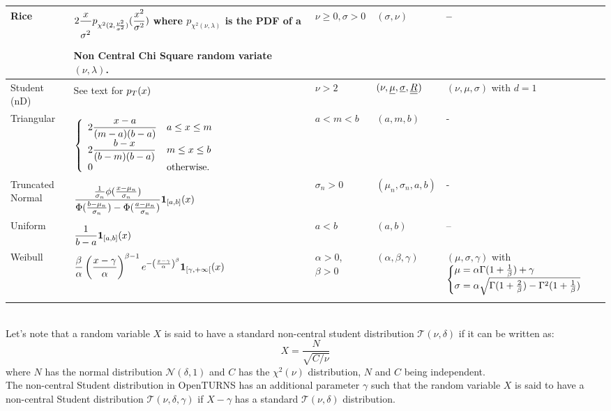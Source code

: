 {\begin{tabular}{|p{2cm}|p{5.3cm}|p{2.7cm}|p{1.7cm}|p{4.6cm}|}
    Rice & $\displaystyle 2\frac{x}{\sigma_{\strut}^{2^{\strut}}}p_{\chi^2(2,\frac{\nu^2}{\sigma^2})}(\frac{x^2}{\sigma^2})$ where $p_{\chi^2(\nu, \lambda)}$ is the PDF of a Non Central Chi Square random variate $(\nu, \lambda)$. & $\nu \geq 0, \sigma>0$ & $( \sigma, \nu)$ & -- \\
    \hline
    Student (nD) & See text for $p_T(x)^{\strut}$ & $\nu > 2$ & $(\nu,{\underline{\mu}}, {\underline{\sigma}}, {\underline{\underline{R}}}_{\strut} )$ & $(\nu, \mu, \sigma)$ with $d=1$ \\
    \hline
    Triangular & $  \displaystyle \left\{
      \begin{array}{ll}
        \displaystyle 2\frac{x-a}{(m-a)(b-a)} & a \leq x \leq m \\
        \displaystyle 2\frac{b-x}{(b-m)(b-a)} & m \leq x \leq b \\
        0 & \mbox{otherwise.}
      \end{array}
    \right.^{\strut} $ & $a < m < b$ & $(a, m, b)$ & - \\
    \hline
    Truncated Normal & $  \displaystyle \frac{\frac{1^{\strut}}{\sigma_n}\phi(\frac{x-\mu_n}{\sigma_n})}
    {\Phi(\frac{b-\mu_n}{\sigma_n}) - \Phi(\frac{a-\mu_n}{\sigma_n})}\boldsymbol{1}_{[a, b]}(x)$
    & $\sigma_n >0$ & $(\mu_n, \sigma_n, a, b)$ & - \\
    \hline
    Uniform & $  \displaystyle \frac{1^{\strut}}{b-a}\boldsymbol{1}_{[a, b]}(x)$ & $a < b$ & $(a, b)$ & -- \\
    \hline
    Weibull &  $\displaystyle \frac{\beta^{\strut}}{\alpha}\left(\frac{x-\gamma}{\alpha}\right)^{\beta-1}e^{-\left(\frac{x-\gamma}{\alpha}\right)^\beta} \boldsymbol{1}_{[\gamma,+\infty[}(x)$ & $\alpha>0$, $\beta>0$ &  $(\alpha, \beta, \gamma)$ & $(\mu, \sigma, \gamma)$ with
    $
    \left\{
      \begin{array}{@{}l@{}}
        \mu =  \alpha\Gamma(1+\frac{1}{\beta}) + \gamma\\
        \sigma =  \alpha\sqrt{\Gamma(1+\frac{2}{\beta}) - \Gamma^2(1+\frac{1}{\beta})}
      \end{array}
    \right._{\strut}
    $ \\
    \hline
  \end{tabular}
}\\

\vspace*{0.2cm}
Let's note that a random variable $X$ is said to have a standard non-central student distribution $\mathcal{T}(\nu, \delta)$ if it can be written as:
\begin{equation}
  X = \frac{N}{\sqrt{C/\nu}}
\end{equation}
where $N$ has the normal distribution $\mathcal{N}(\delta, 1)$ and $C$ has the $\chi^2(\nu)$ distribution, $N$ and $C$ being independent.\\
The non-central Student distribution in OpenTURNS has an additional parameter $\gamma$ such that the random variable $X$ is said to have a non-central Student distribution $\mathcal{T}(\nu, \delta, \gamma)$ if $X-\gamma$ has a standard $\mathcal{T}(\nu,\delta)$ distribution.\\

